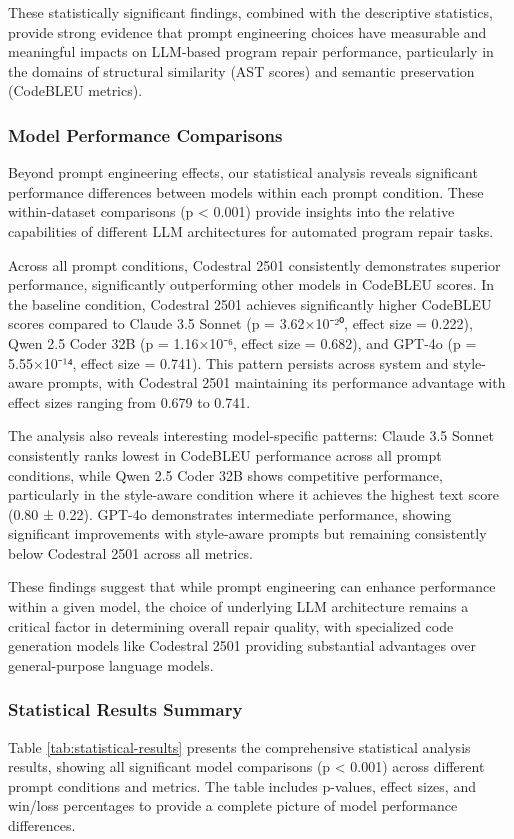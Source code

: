 These statistically significant findings, combined with the descriptive statistics, provide strong evidence that prompt engineering choices have measurable and meaningful impacts on LLM-based program repair performance, particularly in the domains of structural similarity (AST scores) and semantic preservation (CodeBLEU metrics).

\subsubsection{Model Performance Comparisons}
Beyond prompt engineering effects, our statistical analysis reveals significant performance differences between models within each prompt condition. These within-dataset comparisons (p < 0.001) provide insights into the relative capabilities of different LLM architectures for automated program repair tasks.

Across all prompt conditions, Codestral 2501 consistently demonstrates superior performance, significantly outperforming other models in CodeBLEU scores. In the baseline condition, Codestral 2501 achieves significantly higher CodeBLEU scores compared to Claude 3.5 Sonnet (p = 3.62×10⁻²⁰, effect size = 0.222), Qwen 2.5 Coder 32B (p = 1.16×10⁻⁶, effect size = 0.682), and GPT-4o (p = 5.55×10⁻¹⁴, effect size = 0.741). This pattern persists across system and style-aware prompts, with Codestral 2501 maintaining its performance advantage with effect sizes ranging from 0.679 to 0.741.

The analysis also reveals interesting model-specific patterns: Claude 3.5 Sonnet consistently ranks lowest in CodeBLEU performance across all prompt conditions, while Qwen 2.5 Coder 32B shows competitive performance, particularly in the style-aware condition where it achieves the highest text score (0.80 ± 0.22). GPT-4o demonstrates intermediate performance, showing significant improvements with style-aware prompts but remaining consistently below Codestral 2501 across all metrics.

These findings suggest that while prompt engineering can enhance performance within a given model, the choice of underlying LLM architecture remains a critical factor in determining overall repair quality, with specialized code generation models like Codestral 2501 providing substantial advantages over general-purpose language models.

\subsubsection{Statistical Results Summary}
Table \ref{tab:statistical-results} presents the comprehensive statistical analysis results, showing all significant model comparisons (p < 0.001) across different prompt conditions and metrics. The table includes p-values, effect sizes, and win/loss percentages to provide a complete picture of model performance differences.

